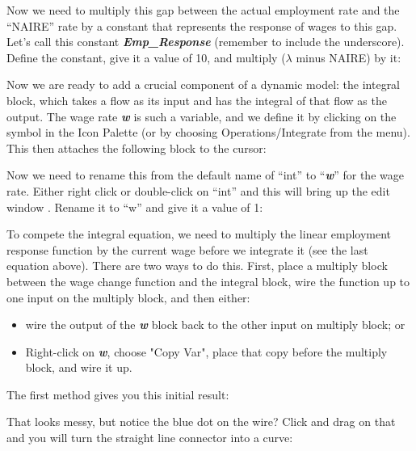 
Now we need to multiply this gap between the actual employment rate
and the ``NAIRE'' rate by a constant that represents the response of
wages to this gap. Let's call this constant {\bf\em Emp\_Response} (remember to include the underscore). Define the constant, give it a value of 10, and multiply ($\lambda$ minus NAIRE) by it:


Now we are ready to add a crucial component of a dynamic model: the
integral block, which takes a flow as its input and has the integral
of that flow as the output. The wage rate {\bf\em w} is such a variable, and we
define it by clicking on the  symbol in the Icon Palette (or by
choosing Operations/Integrate from the menu). This then attaches the
following block to the cursor: 

\begin{center}
\end{center}


Now we need to rename this from the default name of ``int'' to
``{\em\bf w}'' for the wage rate. Either right click or double-click
on ``int'' and this will bring up the edit window . Rename it to ``w'' and
give it a value of 1: 

\begin{center}
\end{center}

To compete the integral equation, we need to multiply the linear
employment response function by the current wage before we integrate
it (see the last equation above). There are two ways to do
this. First, place a multiply block between the wage change function
and the integral block, wire the function up to one input on the
multiply block, and then either:

\begin{itemize}
\item wire the output of the {\bf\em w} block back to the other input
on multiply block; or
\item Right-click on {\bf\em w}, choose "Copy Var", place that copy
before the multiply block, and wire it up.
\end{itemize}

The first method gives you this initial result:


That looks messy, but notice the blue dot on the wire? Click and drag
on that and you will turn the straight line connector into a curve: 

